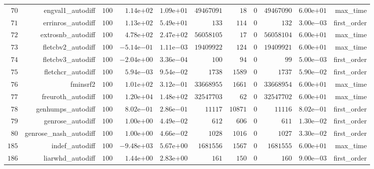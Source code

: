 \documentclass[varwidth=20cm,crop=true]{standalone}
\begin{document}
\begin{longtable}{rrrrrrrrrrr}
  \(    70\) & engval1\_autodiff & \(   100\) & \( 1.14\)e\(+02\) & \( 1.09\)e\(+01\) & \(49467091\) & \(    18\) & \(     0\) & \(49467090\) & \( 6.00\)e\(+01\) & max\_time \\
  \(    71\) & errinros\_autodiff & \(   100\) & \( 1.13\)e\(+02\) & \( 5.49\)e\(+01\) & \(   133\) & \(   114\) & \(     0\) & \(   132\) & \( 3.00\)e\(-03\) & first\_order \\
  \(    72\) & extrosnb\_autodiff & \(   100\) & \( 4.78\)e\(+02\) & \( 2.47\)e\(+02\) & \(56058105\) & \(    17\) & \(     0\) & \(56058104\) & \( 6.00\)e\(+01\) & max\_time \\
  \(    73\) & fletcbv2\_autodiff & \(   100\) & \(-5.14\)e\(-01\) & \( 1.11\)e\(-03\) & \(19409922\) & \(   124\) & \(     0\) & \(19409921\) & \( 6.00\)e\(+01\) & max\_time \\
  \(    74\) & fletcbv3\_autodiff & \(   100\) & \(-2.04\)e\(+00\) & \( 3.36\)e\(-04\) & \(   100\) & \(    94\) & \(     0\) & \(    99\) & \( 5.00\)e\(-03\) & first\_order \\
  \(    75\) & fletchcr\_autodiff & \(   100\) & \( 5.94\)e\(-03\) & \( 9.54\)e\(-02\) & \(  1738\) & \(  1589\) & \(     0\) & \(  1737\) & \( 5.90\)e\(-02\) & first\_order \\
  \(    76\) & fminsrf2 & \(   100\) & \( 1.01\)e\(+02\) & \( 3.12\)e\(-01\) & \(33668955\) & \(  1661\) & \(     0\) & \(33668954\) & \( 6.00\)e\(+01\) & max\_time \\
  \(    77\) & freuroth\_autodiff & \(   100\) & \( 1.20\)e\(+04\) & \( 1.48\)e\(+02\) & \(32547703\) & \(    62\) & \(     0\) & \(32547702\) & \( 6.00\)e\(+01\) & max\_time \\
  \(    78\) & genhumps\_autodiff & \(   100\) & \( 8.02\)e\(-01\) & \( 2.86\)e\(-01\) & \( 11117\) & \( 10871\) & \(     0\) & \( 11116\) & \( 8.02\)e\(-01\) & first\_order \\
  \(    79\) & genrose\_autodiff & \(   100\) & \( 1.00\)e\(+00\) & \( 4.49\)e\(-02\) & \(   612\) & \(   606\) & \(     0\) & \(   611\) & \( 1.30\)e\(-02\) & first\_order \\
  \(    80\) & genrose\_nash\_autodiff & \(   100\) & \( 1.00\)e\(+00\) & \( 4.66\)e\(-02\) & \(  1028\) & \(  1016\) & \(     0\) & \(  1027\) & \( 3.30\)e\(-02\) & first\_order \\
  \(   185\) & indef\_autodiff & \(   100\) & \(-9.48\)e\(+03\) & \( 5.67\)e\(+00\) & \(1681556\) & \(  1567\) & \(     0\) & \(1681555\) & \( 6.00\)e\(+01\) & max\_time \\
  \(   186\) & liarwhd\_autodiff & \(   100\) & \( 1.44\)e\(+00\) & \( 2.83\)e\(+00\) & \(   161\) & \(   150\) & \(     0\) & \(   160\) & \( 9.00\)e\(-03\) & first\_order \\

\end{longtable}
\end{document}
